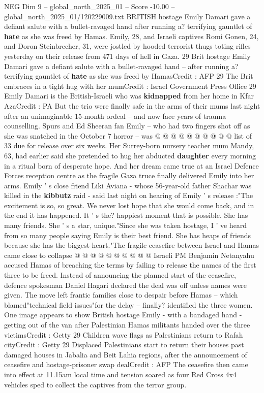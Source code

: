 \begin{textsample}{NEG Dim 9 – global\_north\_2025\_01 – Score -10.00 – global\_north\_2025\_01/120229009.txt}  \label{ex:f9_neg_023}
BRITISH hostage Emily Damari gave a defiant salute with a bullet-ravaged hand after running a? terrifying gauntlet of \textbf{hate} as she was freed by Hamas.
Emily, 28, and Israeli captives Romi Gonen, 24, and Doron Steinbrecher, 31, were jostled by hooded terrorist thugs toting rifles yesterday on their release from 471 days of hell in Gaza. 29 Brit hostage Emily Damari gave a defiant salute with a bullet-ravaged hand -- after running a? terrifying gauntlet of \textbf{hate} as she was freed by HamasCredit : AFP 29 The Brit embraces in a tight hug with her mumCredit : Israel Government Press Office 29 Emily Damari is the British-Israeli who was \textbf{kidnapped} from her home in Kfar AzaCredit : PA But the trio were finally safe in the arms of their mums last night after an unimaginable 15-month ordeal -- and now face years of trauma counselling.
Spurs and Ed Sheeran fan Emily -- who had two fingers shot off as she was snatched in the October 7 horror -- was @ @ @ @ @ @ @ @ @ @ list of 33 due for release over six weeks.
Her Surrey-born nursery teacher mum Mandy, 63, had earlier said she pretended to hug her abducted \textbf{daughter} every morning in a ritual born of desperate hope.
And her dream came true at an Israel Defence Forces reception centre as the fragile Gaza truce finally delivered Emily into her arms.
Emily ' s close friend Liki Aviana - whose 56-year-old father Shachar was killed in the \textbf{kibbutz} raid - said last night on hearing of Emily ' s release :"The excitement is so, so great.
We never lost hope that she would come back, and in the end it has happened.
It ' s the? happiest moment that is possible.
She has many friends.
She ' s a star, unique."Since she was taken hostage, I ' ve heard from so many people saying Emily is their best friend.
She has heaps of friends because she has the biggest heart."The fragile ceasefire between Israel and Hamas came close to collapse @ @ @ @ @ @ @ @ @ @ Israeli PM Benjamin Netanyahu accused Hamas of breaching the terms by failing to release the names of the first three to be freed.
Instead of announcing the planned start of the ceasefire, defence spokesman Daniel Hagari declared the deal was off unless names were given.
The move left frantic families close to despair before Hamas -- which blamed"technical field issues"for the delay -- finally? identified the three women.
One image appears to show British hostage Emily - with a bandaged hand - getting out of the van after Palestinian Hamas militants handed over the three victimsCredit : Getty 29 Children wave flags as Palestinians return to Rafah cityCredit : Getty 29 Displaced Palestinians start to return their houses past damaged houses in Jabalia and Beit Lahia regions, after the announcement of ceasefire and hostage-prisoner swap dealCredit : AFP The ceasefire then came into effect at 11.15am local time and tension soared as four Red Cross 4x4 vehicles sped to collect the captives from the terror group.

\end{textsample}

